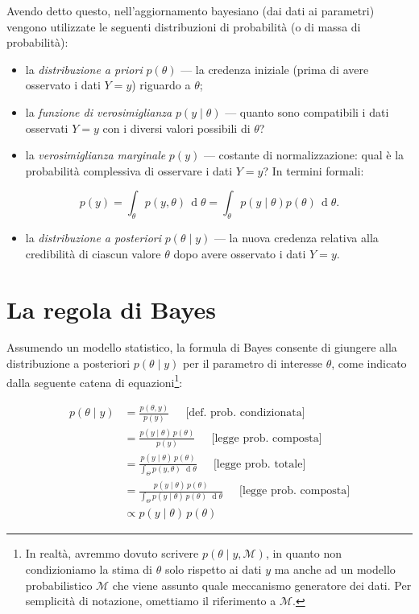 \documentclass[
  11pt,
]{krantz}
\providecommand{\tightlist}{%
  \setlength{\itemsep}{0pt}\setlength{\parskip}{0pt}}
\theoremstyle{definition}
\theoremstyle{definition}
\theoremstyle{definition}
\theoremstyle{definition}
\theoremstyle{remark}
\begin{document}
Avendo detto questo, nell'aggiornamento bayesiano (dai dati ai parametri) vengono utilizzate le seguenti distribuzioni di probabilità (o di massa di probabilità):

\begin{itemize}
\tightlist
\item
  la \emph{distribuzione a priori} \(p(\theta)\) --- la credenza iniziale (prima di avere osservato i dati \(Y = y\)) riguardo a \(\theta\);
\item
  la \emph{funzione di verosimiglianza} \(p(y \mid \theta)\) --- quanto sono compatibili i dati osservati \(Y = y\) con i diversi valori possibili di \(\theta\)?
\item
  la \emph{verosimiglianza marginale} \(p(y)\) --- costante di normalizzazione: qual è la probabilità complessiva di osservare i dati \(Y = y\)? In termini formali:
\end{itemize}

\[
p(y) = \int_\theta p(y, \theta) \,\operatorname {d}\!\theta = \int_\theta p(y \mid \theta) p(\theta) \,\operatorname {d}\!\theta.
\]

\begin{itemize}
\tightlist
\item
  la \emph{distribuzione a posteriori} \(p(\theta \mid y)\) --- la nuova credenza relativa alla credibilità di ciascun valore \(\theta\) dopo avere osservato i dati \(Y = y\).
\end{itemize}

\hypertarget{la-regola-di-bayes}{%
\section{La regola di Bayes}\label{la-regola-di-bayes}}

Assumendo un modello statistico, la formula di Bayes consente di giungere alla distribuzione a posteriori \(p(\theta \mid y)\) per il parametro di interesse \(\theta\), come indicato dalla seguente catena di equazioni\footnote{In realtà, avremmo dovuto scrivere \(p(\theta \mid y, \mathcal{M})\), in quanto non condizioniamo la stima di \(\theta\) solo rispetto ai dati \(y\) ma anche ad un modello probabilistico \(\mathcal{M}\) che viene assunto quale meccanismo generatore dei dati. Per semplicità di notazione, omettiamo il riferimento a \(\mathcal{M}\).}:

\begin{align}
p(\theta \mid y)  &= \displaystyle \frac{p(\theta,y)}{p(y)}
 \ \ \ \ \ \mbox{ [def. prob. condizionata]}
\\
&= \displaystyle \frac{p(y \mid \theta) \, p(\theta)}{p(y)}
 \ \ \ \ \ \mbox{ [legge prob. composta]}
\\
&=  \displaystyle \frac{p(y \mid\theta) \, p(\theta)}
                        {\int_{\Theta} p(y,\theta) \, \,\operatorname {d}\!\theta}
 \ \ \ \ \ \mbox{ [legge prob. totale]}
\\
&= \displaystyle \frac{p(y \mid\theta) \, p(\theta)}
                        {\int_{\Theta} p(y \mid\theta) \, p(\theta) \, \,\operatorname {d}\!\theta}
 \ \ \ \ \ \mbox{ [legge prob. composta]}
\\
& \propto \displaystyle p(y \mid\theta) \, p(\theta)
\label{eq:bayesmodel}
\end{align}
\end{document}
